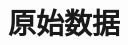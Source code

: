 \documentclass[UTF8]{ctexart}
\begin{document}
\section{原始数据}
\begin{figure}[hb]
\end{figure}
\end{document}
